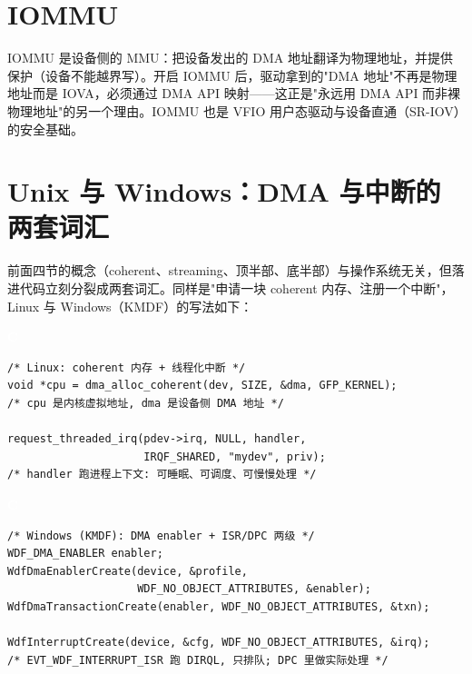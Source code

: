 \documentclass[12pt,a4paper,fontset=fandol]{ctexbook}
\newcommand{\clabel}{%
  \begin{tcolorbox}[enhanced,colback=cheadbg,colframe=cheadbg,
    arc=1mm,boxrule=0mm,left=6pt,right=6pt,top=2pt,bottom=2pt,
    halign=left,oversize]
    \textcolor{white}{\small\bfseries C}
  \end{tcolorbox}\vspace{-4pt}}
\begin{document}
\section{IOMMU}\label{sec:iommu}

IOMMU 是设备侧的 MMU：把设备发出的 DMA 地址翻译为物理地址，并提供保护（设备不能越界写）。开启 IOMMU 后，驱动拿到的"DMA 地址"不再是物理地址而是 IOVA，必须通过 DMA API 映射——这正是"永远用 DMA API 而非裸物理地址"的另一个理由。IOMMU 也是 VFIO 用户态驱动与设备直通（SR-IOV）的安全基础。

\section{Unix 与 Windows：DMA 与中断的两套词汇}\label{sec:dma-irq-os}

前面四节的概念（coherent、streaming、顶半部、底半部）与操作系统无关，但落进代码立刻分裂成两套词汇。同样是"申请一块 coherent 内存、注册一个中断"，Linux 与 Windows（KMDF）的写法如下：

\clabel
\begin{lstlisting}[style=cstyle]
/* Linux: coherent 内存 + 线程化中断 */
void *cpu = dma_alloc_coherent(dev, SIZE, &dma, GFP_KERNEL);
/* cpu 是内核虚拟地址, dma 是设备侧 DMA 地址 */

request_threaded_irq(pdev->irq, NULL, handler,
                     IRQF_SHARED, "mydev", priv);
/* handler 跑进程上下文: 可睡眠、可调度、可慢慢处理 */
\end{lstlisting}

\clabel
\begin{lstlisting}[style=cstyle]
/* Windows (KMDF): DMA enabler + ISR/DPC 两级 */
WDF_DMA_ENABLER enabler;
WdfDmaEnablerCreate(device, &profile,
                    WDF_NO_OBJECT_ATTRIBUTES, &enabler);
WdfDmaTransactionCreate(enabler, WDF_NO_OBJECT_ATTRIBUTES, &txn);

WdfInterruptCreate(device, &cfg, WDF_NO_OBJECT_ATTRIBUTES, &irq);
/* EVT_WDF_INTERRUPT_ISR 跑 DIRQL, 只排队; DPC 里做实际处理 */
\end{lstlisting}
\end{document}
